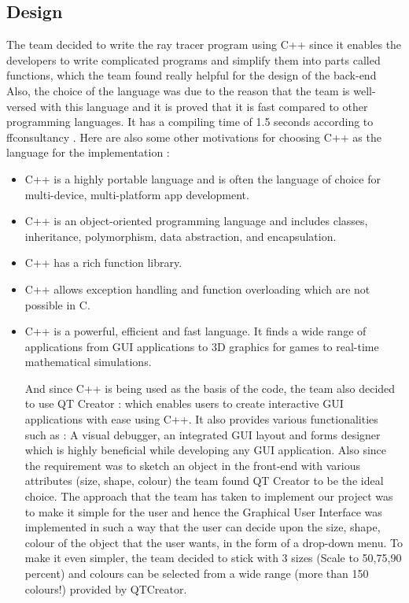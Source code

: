 \documentclass{article}
\begin{document}
\subsection{Design}

The team decided to write the ray tracer program using C++ since it enables the developers to write complicated programs and simplify them into parts called functions, which the team found really helpful for the design of the back-end Also, the choice of the language was due to the reason that the team is well-versed with this language and it is proved that it is fast compared to other programming languages. It has a compiling time of 1.5 seconds according to ffconsultancy \cite{3}. Here are also some other motivations for choosing C++ as the language for the implementation \cite{12}: 
\begin{itemize}
    \item 
	C++ is a highly portable language and is often the language of choice for multi-device, multi-platform app development.
\item	C++ is an object-oriented programming language and includes classes, inheritance, polymorphism, data abstraction, and encapsulation.
\item	C++ has a rich function library.
\item	C++ allows exception handling and function overloading which are not possible in C.
\item	C++ is a powerful, efficient and fast language. It finds a wide range of applications { from GUI applications to 3D graphics for games to real-time
mathematical simulations}.


And since C++ is being used as the basis of the code, the team also decided to use QT Creator : which enables users to create interactive GUI applications with ease using C++. It also provides various functionalities such as : A visual debugger, an integrated GUI layout and forms designer which is highly beneficial while developing any GUI application. Also since the requirement was to sketch an object in the front-end with various attributes (size, shape, colour) the team found QT Creator to be the ideal choice. 
The approach that the team has taken to implement our project was to make it simple for the user and hence the Graphical User Interface was implemented in such a way that the user can decide upon the size, shape, colour of the object that the user wants, in the form of a drop-down menu. To make it even simpler, the team decided to stick with 3 sizes (Scale to 50,75,90 percent) and colours can be selected from a wide range (more than 150 colours!) provided by QTCreator.


\end{itemize}
\end{document}
